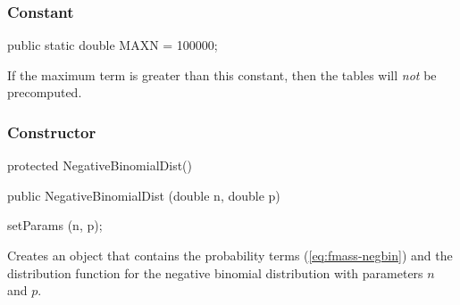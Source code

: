 \begin{detailed}
\unmoved\subsubsection* {Constant}

\begin{code}
   public static double MAXN = 100000;
\end{code}
 \begin{tabb} If the maximum term is greater than this constant,
   then the tables will {\em not\/} be precomputed.
\end{tabb}
\end{detailed}

\subsubsection* {Constructor}
\begin{code}
\begin{hide}
   protected NegativeBinomialDist() {}

\end{hide}

   public NegativeBinomialDist (double n, double p)\begin{hide} {
      setParams (n, p);
   }\end{hide}
\end{code}
 \begin{tabb}
   Creates an object that contains the probability
   terms (\ref{eq:fmass-negbin}) and the distribution function for
   the negative binomial distribution with parameters $n$ and $p$.
 \end{tabb}


